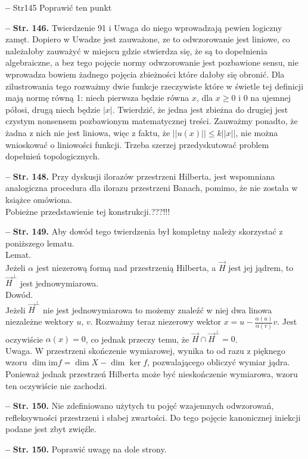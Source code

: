 \documentclass[a4paper]{article}
\newcommand{\tr}{\textrm}
\newcommand{\im}{\tr{im}}
\newcommand{\fr}{\frac}
\newcommand{\al}{\alpha}
\newcommand{\tb}{\textbf}
\newcommand{\noi}{\noindent}
\newcommand{\start}{\noi \tb{--} {}}
\newcommand{\Str}[1]{\tb{Str. #1.}}
\begin{document}
\start Str{145} Poprawić ten punkt

\start \Str{146} Twierdzenie 91 i Uwaga do niego wprowadzają pewien
logiczny zamęt. Dopiero w Uwadze jest zauważone, ze to odwzorowanie
jest liniowe, co należałoby zauważyć w miejscu gdzie stwierdza się, że
są to dopełnienia algebraiczne, a bez tego pojęcie normy odwzorowanie
jest pozbawione sensu, nie wprowadza bowiem żadnego pojęcia zbieżności
które dałoby się obronić. Dla zilustrowania tego rozważmy dwie funkcje
rzeczywiste które w świetle tej definicji mają normę równą 1: niech
pierwsza będzie równa $x$, dla $x \geq 0$ i 0 na ujemnej półosi, drugą
niech będzie $| x |$. Twierdzić, że jedna jest zbieżna do drugiej jest
czystym nonsensem pozbawionym matematycznej treści. Zauważmy ponadto,
że żadna z nich nie jest liniowa, więc z faktu, że
$|| u( x ) || \leq k || x ||$, nie można wnioskować o liniowości
funkcji. Trzeba szerzej przedyskutować problem dopełnień
topologicznych.

\start \Str{148} Przy dyskusji ilorazów przestrzeni Hilberta, jest wspomniana analogiczna procedura dla ilorazu przestrzeni Banach, pomimo, że nie została w książce omówiona. \\
Pobieżne przedstawienie tej konstrukcji.???!!!

\start \Str{149} Aby dowód tego twierdzenia był kompletny należy skorzystać z poniższego lematu.\\
Lemat.\\
Jeżeli $\al$ jest niezerową formą nad przestrzenią Hilberta, a $\vec{ H }$ jest jej jądrem, to $\vec{ H }^{ \bot }$ jest jednowymiarowa.\\
Dowód.\\
Jeżeli $\vec{ H }^{ \bot }$ nie jest jednowymiarowa to możemy znaleźć w niej dwa linowa niezależne wektory $u$, $v$. Rozważmy teraz niezerowy wektor $x = u -\fr{ \al( u ) }{ \al( v ) }v$. Jest oczywiście $\al( x ) = 0$, co jednak przeczy temu, że $\vec{ H } \cap \vec{ H }^{ \bot } =  0$.\\
Uwaga. W przestrzeni skończenie wymiarowej, wynika to od razu z
pięknego wzoru $\dim\im f = \dim X - \dim\ker f$, pozwalającego
obliczyć wymiar jądra. Ponieważ jednak przestrzeń Hilberta może być
nieskończenie wymiarowa, wzoru ten oczywiście nie zachodzi.

\start \Str{150} Nie zdefiniowano użytych tu pojęć wzajemnych
odwzorowań, refleksywności przestrzeni i słabej zwartości. Do tego
pojęcie kanonicznej iniekcji podane jest zbyt zwięźle.

\start \Str{150} Poprawić uwagę na dole strony.
\end{document}
